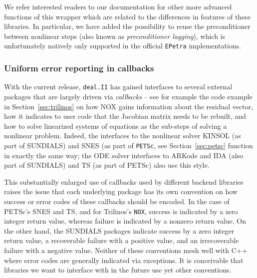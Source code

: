 \documentclass{ansarticle-preprint}
\newcommand{\specialword}[1]{\texttt{#1}}
\newcommand{\dealii}{{\specialword{deal.II}}\xspace}
\begin{document}
We refer interested readers to our documentation for other more advanced
functions of this wrapper which are related to the differences in features of these libraries.
In particular, we have added the possibility to reuse the preconditioner between
nonlinear steps (also known as \textit{preconditioner lagging}), which is
unfortunately natively only  supported in the official \texttt{EPetra} implementations.



\subsubsection{Uniform error reporting in callbacks}\label{sec:callbacks}

With the current release, \dealii{} has gained interfaces to several
external packages that are largely driven via \textit{callbacks} --
see for example the code example in Section~\ref{sec:trilinos} on how
NOX gains information about the residual vector, how it indicates to
user code that the Jacobian matrix needs to be rebuilt,
and how to solve linearized systems of equations as the sub-steps of
solving a nonlinear problem. Indeed, the interfaces to the nonlinear
solver KINSOL (as part of SUNDIALS) and SNES (as part of \texttt{PETSc}, see
Section~\ref{sec:petsc} function in exactly the same way; the
ODE solver interfaces to ARKode and IDA (also part of SUNDIALS) and TS
(as part of PETSc) also use this style.

This substantially enlarged use of callbacks used by different backend
libraries raises the issue that each underlying package has its own
convention on how success or error codes of these callbacks should be
encoded. In the case of PETSc's SNES and TS, and for Trilinos's \texttt{NOX},
success is indicated by a zero integer return value, whereas failure is
indicated by a nonzero return value. On the other hand, the SUNDIALS
packages indicate success by a zero integer return value, a
recoverable failure with a positive value, and an irrecoverable failure
with a negative value. Neither of these conventions mesh well with C++
where error codes are generally indicated via exceptions.
It is conceivable that libraries we want to
interface with in the future use yet other conventions.
\end{document}

